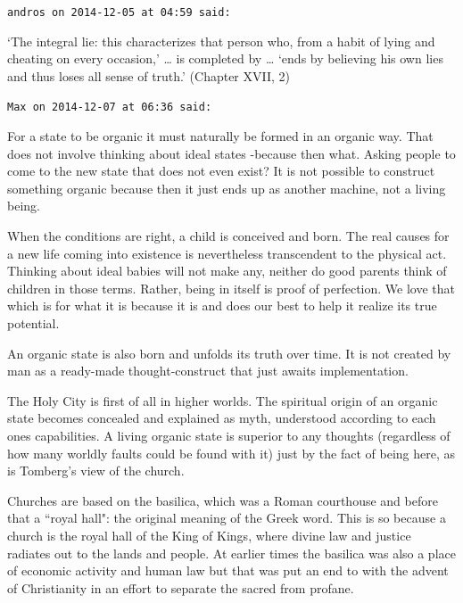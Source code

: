 \begin{footnotesize}\begin{sffamily}



\texttt{andros on 2014-12-05 at 04:59 said: }

`The integral lie: this characterizes that person who, from a habit of lying and cheating on every occasion,' … is completed by … `ends by believing his own lies and thus loses all sense of truth.' (Chapter XVII, 2)


\hfill

\texttt{Max on 2014-12-07 at 06:36 said: }

For a state to be organic it must naturally be formed in an organic way. That does not involve thinking about ideal states -because then what. Asking people to come to the new state that does not even exist? It is not possible to construct something organic because then it just ends up as another machine, not a living being.

When the conditions are right, a child is conceived and born. The real causes for a new life coming into existence is nevertheless transcendent to the physical act. Thinking about ideal babies will not make any, neither do good parents think of children in those terms. Rather, being in itself is proof of perfection. We love that which is for what it is because it is and does our best to help it realize its true potential.

An organic state is also born and unfolds its truth over time. It is not created by man as a ready-made thought-construct that just awaits implementation. 

The Holy City is first of all in higher worlds. The spiritual origin of an organic state becomes concealed and explained as myth, understood according to each ones capabilities. A living organic state is superior to any thoughts (regardless of how many worldly faults could be found with it) just by the fact of being here, as is Tomberg's view of the church. 

Churches are based on the basilica, which was a Roman courthouse and before that a ``royal hall": the original meaning of the Greek word. This is so because a church is the royal hall of the King of Kings, where divine law and justice radiates out to the lands and people. At earlier times the basilica was also a place of economic activity and human law but that was put an end to with the advent of Christianity in an effort to separate the sacred from profane.



\end{sffamily}
\end{footnotesize}
